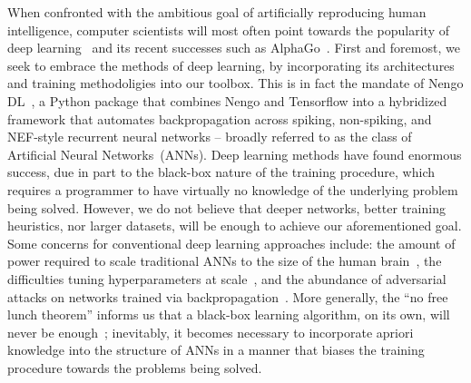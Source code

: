 When confronted with the ambitious goal of artificially reproducing human intelligence, computer scientists will most often point towards
the popularity of deep learning~\citep{lecun2015deep} and its recent successes such as AlphaGo~\citep{gibney2016google}.
First and foremost, we seek to embrace the methods of deep learning, by incorporating its architectures and training methodoligies into our toolbox.
This is in fact the mandate of Nengo DL~\citep{rasmussen2018nengodl}, a Python package that combines Nengo and Tensorflow into a hybridized framework that automates backpropagation across spiking, non-spiking, and NEF-style recurrent neural networks -- broadly referred to as the class of Artificial Neural Networks~(ANNs).
Deep learning methods have found enormous success, due in part to the black-box nature of the training procedure, which requires a programmer to have virtually no knowledge of the underlying problem being solved.
However, we do not believe that deeper networks, better training heuristics, nor larger datasets, will be enough to achieve our aforementioned goal.
Some concerns for conventional deep learning approaches include: the amount of power required to scale traditional ANNs to the size of the human brain~\citep{furber2012build}, the difficulties tuning hyperparameters at scale~\citep{bergstra2015hyperopt}, and the abundance of adversarial attacks on networks trained via backpropagation~\citep{su2019one}.
More generally, the ``no free lunch theorem'' informs us that a black-box learning algorithm, on its own, will never be enough~\citep{wolpert1996lack}; inevitably, it becomes necessary to incorporate apriori knowledge into the structure of ANNs in a manner that biases the training procedure towards the problems being solved.

